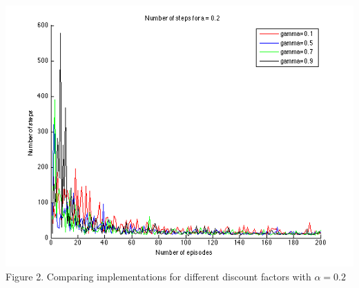 \documentclass[a4paper,11pt]{article}
\begin{document}
\begin{center}
\includegraphics[width=1.0\textwidth,height=0.4\textheight]{a2.png}
\label{Figure 2}
Figure 2. 	Comparing implementations for different discount factors with $\alpha = 0.2$\vspace{1cm}
\end{center}
\end{document}
